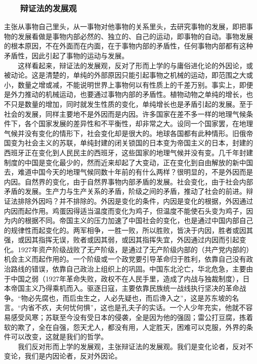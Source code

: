\documentclass[cn,11pt,chinese]{elegantbook}
\def\myformat#1{\hfil\hfil #1}
\begin{document}
\subsubsection*{\myformat{　　辩证法的发展观}}
主张从事物自己里头，从一事物对他事物的关系里头，去研究事物的发展，即把事物的发展看做是事物内部必然的、独立的、自己的运动，即事物的自动。事物发展的根本原因，不在外面而在内面，在于事物内部的矛盾性，任何事物内部都有这种矛盾性，因此引起了事物的运动与发展。\\
　　这样看起来，辩证法的发展观，反对了形而上学的与庸俗进化论的外因论，或被动论。这是清楚的，单纯的外部原因只能引起事物之机械的运动，即范围之大或小，数量之增或减，不能说明世界上事物何以有性质上的千差万别。事实上，即便是外力推动的机械运动，也要通过事物内部的矛盾性。植物动物之单纯的增长，也不只是数量的增加，同时就发生性质的变化，单纯增长也是矛盾引起的发展。至于社会的发展，同样主要地不是外因而是内因。许多国家在差不多一样的地理气候条件下，各个国家发展的差异性和不平衡性，却非常之大。设同一个国家罢，在地理气候并没有变化的情形下，社会变化却是很大的。地球各国都有此种情形。旧俄帝国变为社会主义的苏联，单纯封建的闭关锁国的日本变为帝国主义的日本，封建的西班牙正在变化到人民民主的西班牙，这些国家的地理气候并没有变。几千年封建制度的中国是变化最少的，然而近来却起了大变动，正在变化到自由解放的新中国去，难道中国今天的地理气候同数十年前的有什么两样？很明显的，不是外因而是内因。自然界的变化，由于自然界事物内部矛盾的发展。社会变化，由于社会内部矛盾的发展。生产力与生产关系的矛盾，阶级之间的矛盾，推动了社会的前进。辩证法排除外因吗？并不排除的。外因是变化的条件，内因是变化的根据，外因通过内因而起作用。鸡蛋因得适当温度而变化为鸡子，但温度不能使石头变为鸡子，因为内的根据不同。帝国主义的压力加速了中国社会的变化，也是通过中国内部自己的规律性而起变化的。两军相争，一胜一败，所以胜败，皆决于内因，胜者或因其强，或因其指挥无误，败者或因其弱，或因其指挥失宜，外因通过内因而引起变化。1927年资产阶级战败了无产阶级，是通过了无产阶级内部的（共产党内部的）机会主义而起作用的。一个阶级或一个政党要引导革命归于胜利，依靠自己没有政治路线的错误，依靠自己政治上组织上的巩固。中国东北沦亡，华北危急，主要由于中国之弱（1927年革命失败，政权不在人民手里，造成了内战与独裁制度），日本帝国主义乃得乘机而入。驱逐日寇，主要依靠民族统一战线执行坚决的革命战争。“物必先腐也，而后虫生之，人必先疑也，而后谗入之”，这是苏东坡的名言。“内省不疚，夫何忧何惧”，这也是孔夫子的实话。一个人少年充实，他就不容易感受风寒；苏联至今没有受日本的侵袭，全是因为他的强固；雷公打豆腐，拣着软的欺了，全在自强，怨天尤人，都没有用，人定胜天，困难可以克服，外界的条件可以改变，这就是我们的哲学。\\
　　我们反对形而上学的发展观，主张辩证法的发展观。我们是变化论者，反对不变论，我们是内因论者，反对外因论。\\
\end{document}
